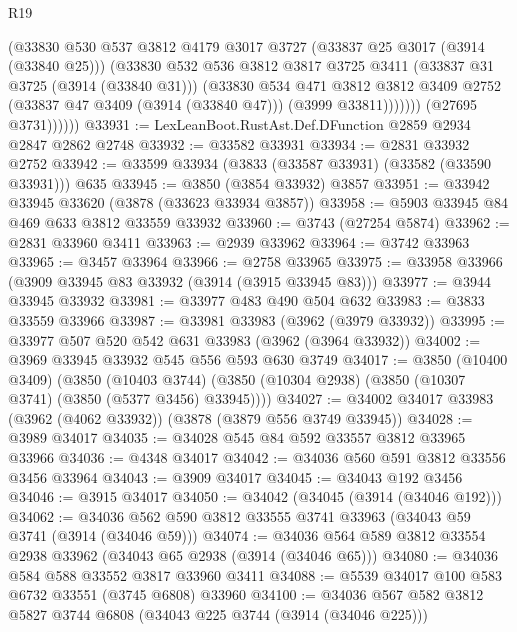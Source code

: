 \begin{lexlean}{R19}
\begin{coremodule}
                    (@33830
                      @530
                      @537
                      @3812
                      @4179
                      @3017
                      @3727
                      (@33837 @25 @3017 (@3914 (@33840 @25)))
                      (@33830
                        @532
                        @536
                        @3812
                        @3817
                        @3725
                        @3411
                        (@33837 @31 @3725 (@3914 (@33840 @31)))
                        (@33830
                          @534
                          @471
                          @3812
                          @3812
                          @3409
                          @2752
                          (@33837 @47 @3409 (@3914 (@33840 @47)))
                          (@3999 @33811)))))))
              (@27695 @3731))))))
@33931 := LexLeanBoot.RustAst.Def.DFunction @2859 @2934 @2847 @2862 @2748
@33932 := @33582 @33931
@33934 := @2831 @33932 @2752
@33942 := @33599 @33934 (@3833 (@33587 @33931) (@33582 (@33590 @33931))) @635
@33945 := @3850 (@3854 @33932) @3857
@33951 := @33942 @33945 @33620 (@3878 (@33623 @33934 @3857))
@33958 := @5903 @33945 @84 @469 @633 @3812 @33559 @33932
@33960 := @3743 (@27254 @5874)
@33962 := @2831 @33960 @3411
@33963 := @2939 @33962
@33964 := @3742 @33963
@33965 := @3457 @33964
@33966 := @2758 @33965
@33975 := @33958 @33966 (@3909 @33945 @83 @33932 (@3914 (@3915 @33945 @83)))
@33977 := @3944 @33945 @33932
@33981 := @33977 @483 @490 @504 @632
@33983 := @3833 @33559 @33966
@33987 := @33981 @33983 (@3962 (@3979 @33932))
@33995 := @33977 @507 @520 @542 @631 @33983 (@3962 (@3964 @33932))
@34002 := @3969 @33945 @33932 @545 @556 @593 @630 @3749
@34017 := @3850
    (@10400 @3409)
    (@3850
      (@10403 @3744)
      (@3850 (@10304 @2938) (@3850 (@10307 @3741) (@3850 (@5377 @3456) @33945))))
@34027 := @34002 @34017 @33983 (@3962 (@4062 @33932)) (@3878 (@3879 @556 @3749 @33945))
@34028 := @3989 @34017
@34035 := @34028 @545 @84 @592 @33557 @3812 @33965 @33966
@34036 := @4348 @34017
@34042 := @34036 @560 @591 @3812 @33556 @3456 @33964
@34043 := @3909 @34017
@34045 := @34043 @192 @3456
@34046 := @3915 @34017
@34050 := @34042 (@34045 (@3914 (@34046 @192)))
@34062 := @34036 @562 @590 @3812 @33555 @3741 @33963 (@34043 @59 @3741 (@3914 (@34046 @59)))
@34074 := @34036 @564 @589 @3812 @33554 @2938 @33962 (@34043 @65 @2938 (@3914 (@34046 @65)))
@34080 := @34036 @584 @588 @33552 @3817 @33960 @3411
@34088 := @5539 @34017 @100 @583 @6732 @33551 (@3745 @6808) @33960
@34100 := @34036 @567 @582 @3812 @5827 @3744 @6808 (@34043 @225 @3744 (@3914 (@34046 @225)))

\end{coremodule}
\end{lexlean}

